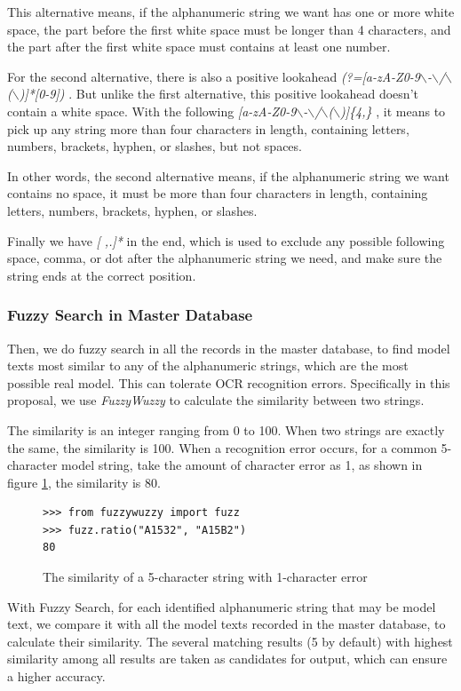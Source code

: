 \documentclass[technicalreport]{ieicej}
\begin{document}
            This alternative means, if the alphanumeric string we want has one or more white space, the part before the first white space must be longer than 4 characters, and the part after the first white space must contains at least one number.

            For the second alternative, there is also a positive lookahead {\em (?=[a-zA-Z0-9$\backslash$-$\backslash$/$\backslash$($\backslash$)]*[0-9]) }. But unlike the first alternative, this positive lookahead doesn't contain a white space. With the following {\em [a-zA-Z0-9$\backslash$-$\backslash$/$\backslash$($\backslash$)]\{4,\} }, it means to pick up any string more than four characters in length, containing letters, numbers, brackets, hyphen, or slashes, but not spaces.

            In other words, the second alternative means, if the alphanumeric string we want contains no space, it must be more than four characters in length, containing letters, numbers, brackets, hyphen, or slashes.

            Finally we have {\em [ ,.]*} in the end, which is used to exclude any possible following space, comma, or dot after the alphanumeric string we need, and make sure the string ends at the correct position.


        \subsubsection{Fuzzy Search in Master Database}
            Then, we do fuzzy search in all the records in the master database, to find model texts most similar to any of the alphanumeric strings, which are the most possible real model. This can tolerate OCR recognition errors. Specifically in this proposal, we use {\em FuzzyWuzzy} to calculate the similarity between two strings.
            
            The similarity is an integer ranging from 0 to 100. When two strings are exactly the same, the similarity is 100. When a recognition error occurs, for a common 5-character model string, take the amount of character error as 1, as shown in figure \ref{fig:code_fuzzwuzzy}, the similarity is 80.
        
            \begin{figure}[tb]
                \begin{lstlisting}
>>> from fuzzywuzzy import fuzz
>>> fuzz.ratio("A1532", "A15B2")
80              \end{lstlisting}
                \caption{The similarity of a 5-character string with 1-character error}
                \label{fig:code_fuzzwuzzy}
            \end{figure}
            With Fuzzy Search, for each identified alphanumeric string that may be model text, we compare it with all the model texts recorded in the master database, to calculate their similarity. The several matching results (5 by default) with highest similarity among all results are taken as candidates for output, which can ensure a higher accuracy.
\end{document}
